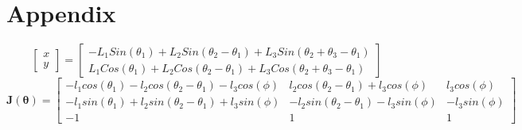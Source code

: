 \documentclass[twoside,twocolumn]{article}
\begin{document}
\onecolumn
\section{Appendix}
\begin{equation}
\begin{bmatrix}
x \\
y
\end{bmatrix}
=
\begin{bmatrix}
-L_1Sin(\theta_1)+L_2Sin(\theta_2-\theta_1)+L_3Sin(\theta_2+\theta_3-\theta_1) \\
L_1Cos(\theta_1)+L_2Cos(\theta_2-\theta_1)+L_3Cos(\theta_2+\theta_3-\theta_1)
\end{bmatrix}
\label{eq:fk}
\end{equation}
 \begin{equation}
\boldsymbol{J(\theta)} = 
\begin{bmatrix}
-l_1cos(\theta_1)-l_2cos(\theta_2-\theta_1)-l_3cos(\phi) & l_2cos(\theta_2-\theta_1)+l_3cos(\phi)& l_3cos(\phi) \\
-l_1sin(\theta_1)+l_2sin(\theta_2-\theta_1)+l_3sin(\phi)& -l_2sin(\theta_2-\theta_1)-l_3sin(\phi)& -l_3sin(\phi) \\
-1 &1 &1
\end{bmatrix}
\label{eq:jac}
\end{equation} 
\end{document}
